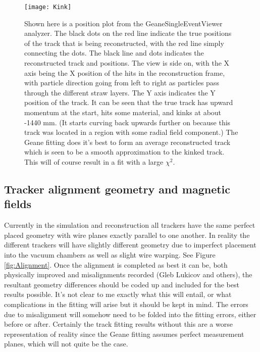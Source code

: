 			\begin{figure}[]
				\caption{Shown here is a position plot from the GeaneSingleEventViewer analyzer. The black dots on the red line indicate the true positions of the track that is being reconstructed, with the red line simply connecting the dots. The black line and dots indicates the reconstructed track and positions. The view is side on, with the X axis being the X position of the hits in the reconstruction frame, with particle direction going from left to right as particles pass through the different straw layers. The Y axis indicates the Y position of the track. It can be seen that the true track has upward momentum at the start, hits some material, and kinks at about -1440 mm. (It starts curving back upwards further on because this track was located in a region with some radial field component.) The Geane fitting does it's best to form an average reconstructed track which is seen to be a smooth approximation to the kinked track. This will of course result in a fit with a large $\chi^{2}$.}
				\centering
				\texttt{[image: Kink]}
				\label{fig:Kink}
			\end{figure}

	\subsection{Tracker alignment geometry and magnetic fields}

		Currently in the simulation and reconstruction all trackers have the same perfect placed geometry with wire planes exactly parallel to one another. In reality the different trackers will have slightly different geometry due to imperfect placement into the vacuum chambers as well as slight wire warping. See Figure \ref{fig:Alignment}. Once the alignment is completed as best it can be, both physically improved and misalignments recorded (Gleb Lukicov and others), the resultant geometry differences should be coded up and included for the best results possible. It's not clear to me exactly what this will entail, or what complications in the fitting will arise but it should be kept in mind. The errors due to misalignment will somehow need to be folded into the fitting errors, either before or after. Certainly the track fitting results without this are a worse representation of reality since the Geane fitting assumes perfect measurement planes, which will not quite be the case.

